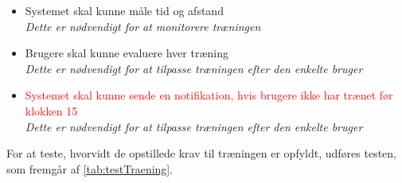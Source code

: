 \begin{itemize}
\item Systemet skal kunne måle tid og afstand
\\
\textit{Dette er nødvendigt for at monitorere træningen}
\item {Brugere skal kunne evaluere hver træning}
\\
\textit{Dette er nødvendigt for at tilpasse træningen efter den enkelte bruger}
\item \textcolor{red}{Systemet skal kunne sende en notifikation, hvis brugere ikke har trænet før klokken 15}
\\
\textit{Dette er nødvendigt for at tilpasse træningen efter den enkelte bruger}
\end{itemize}

\noindent
For at teste, hvorvidt de opstillede krav til træningen er opfyldt, udføres testen, som fremgår af \autoref{tab:testTraening}.

